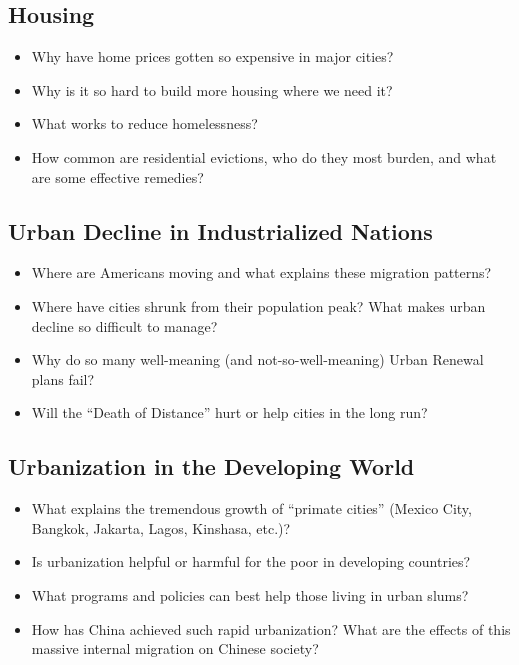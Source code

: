 \documentclass[11pt, letterpaper]{article}
\begin{document}
\subsection*{Housing}

\begin{itemize}
	\item Why have home prices gotten so expensive in major cities?
	\item Why is it so hard to build more housing where we need it? 
	\item What works to reduce homelessness? %
	\item How common are residential evictions, who do they most burden, and what are some effective remedies? %
\end{itemize}

\subsection*{Urban Decline in Industrialized Nations}

\begin{itemize}
	\item Where are Americans moving and what explains these migration patterns?
	\item Where have cities shrunk from their population peak? What makes urban decline so difficult to manage?
	\item Why do so many well-meaning (and not-so-well-meaning) Urban Renewal plans fail? %
	\item Will the ``Death of Distance'' hurt or help cities in the long run?
\end{itemize}

\subsection*{Urbanization in the Developing World}

\begin{itemize}
	\item What explains the tremendous growth of ``primate cities'' (Mexico City, Bangkok, Jakarta, Lagos, Kinshasa, etc.)?
	\item Is urbanization helpful or harmful for the poor in developing countries? %
	\item What programs and policies can best help those living in urban slums?
	\item How has China achieved such rapid urbanization? What are the effects of this massive internal migration on Chinese society? %
\end{itemize}
\end{document}
